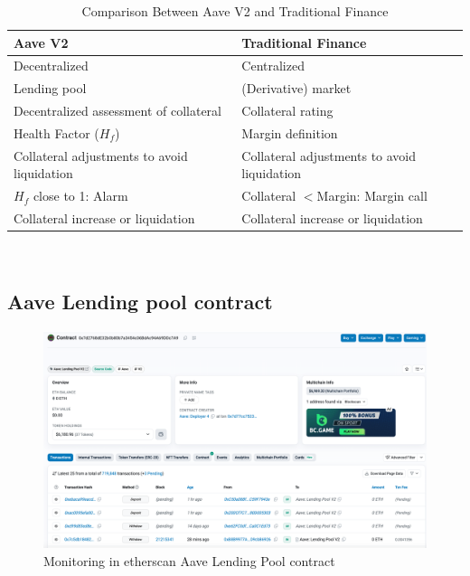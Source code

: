 \documentclass[11pt,a4paper,titlepage]{scrartcl}
\begin{document}
\begin{table}[ht]
\centering
\caption{Comparison Between Aave V2 and Traditional Finance}
\begin{tabular}{ll}\toprule
\textbf{Aave V2} & \textbf{Traditional Finance} \\ \midrule
Decentralized & Centralized \\
Lending pool & (Derivative) market \\
Decentralized assessment of collateral & Collateral rating \\
Health Factor ($H_f$) & Margin definition \\
Collateral adjustments to avoid liquidation & Collateral adjustments to avoid liquidation \\
$H_f$ close to 1: Alarm & Collateral $< $Margin: Margin call \\
Collateral increase or liquidation & Collateral increase or liquidation \\ \bottomrule
\end{tabular}\\
\label{tab:aave_v2_vs_trad_fin}
\end{table}


\subsection{Aave Lending pool contract}

\begin{figure}[ht]
    \includegraphics[width=1\textwidth]{image/etherscanLPool.png}
    \caption{Monitoring in etherscan Aave Lending Pool contract}
    \label{fig:etherscanLPool}
\end{figure}
\end{document}

